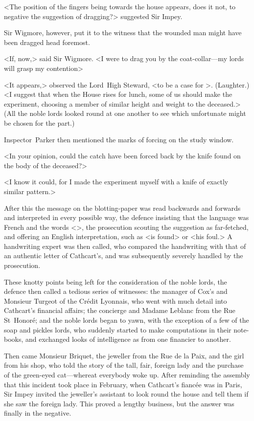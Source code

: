 <The position of the fingers being towards the house appears, does it not, to negative the suggestion of dragging?> suggested Sir Impey.

Sir Wigmore, however, put it to the witness that the wounded man might have been dragged head foremost.

<If, now,> said Sir Wigmore. <I were to drag you by the coat-collar—my lords will grasp my contention\longdash>

<It appears,> observed the Lord~High Steward, <to be a case for >. (Laughter.) <I suggest that when the House rises for lunch, some of us should make the experiment, choosing a member of similar height and weight to the deceased.> (All the noble lords looked round at one another to see which unfortunate might be chosen for the part.)

Inspector~Parker then mentioned the marks of forcing on the study window.

<In your opinion, could the catch have been forced back by the knife found on the body of the deceased?>

<I know it could, for I made the experiment myself with a knife of exactly similar pattern.>

After this the message on the blotting-paper was read backwards and forwards and interpreted in every possible way, the defence insisting that the language was French and the words <>, the prosecution scouting the suggestion as far-fetched, and offering an English interpretation, such as <is found> or <his foul.> A handwriting expert was then called, who compared the handwriting with that of an authentic letter of Cathcart's, and was subsequently severely handled by the prosecution.

These knotty points being left for the consideration of the noble lords, the defence then called a tedious series of witnesses: the manager of Cox's and Monsieur Turgeot of the Crédit Lyonnais, who went with much detail into Cathcart's financial affairs; the concierge and Madame Leblanc from the Rue St~Honoré; and the noble lords began to yawn, with the exception of a few of the soap and pickles lords, who suddenly started to make computations in their note-books, and exchanged looks of intelligence as from one financier to another.

Then came Monsieur Briquet, the jeweller from the Rue de la Paix, and the girl from his shop, who told the story of the tall, fair, foreign lady and the purchase of the green-eyed cat—whereat everybody woke up.  After reminding the assembly that this incident took place in February, when Cathcart's fiancée was in Paris, Sir Impey invited the jeweller's assistant to look round the house and tell them if she saw the foreign lady. This proved a lengthy business, but the answer was finally in the negative.

